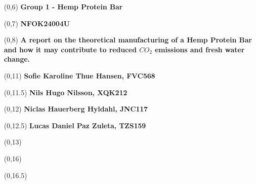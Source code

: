 \begin{titlepage}

    
    \begin{textblock}{9.4}(0,6)
        \Huge{\selectfont\bfseries{Group 1 - Hemp Protein Bar}}
    \end{textblock}
    \begin{textblock}{9.4}(0,7)
        \Huge{\selectfont\bfseries{NFOK24004U}}
    \end{textblock}
    
    \begin{textblock}{9.4}(0,8)
        \LARGE{\selectfont\bfseries{A report on the theoretical manufacturing of a Hemp Protein Bar and how it may contribute to reduced $CO_2$ emissions and fresh water change.}}
    \end{textblock}
    
    \begin{textblock}{9.4}(0,11)
        \large{\selectfont\bfseries{
        Sofie Karoline Thue Hansen, FVC568}}
    \end{textblock}
    \begin{textblock}{9.4}(0,11.5)
        \large{\selectfont\bfseries{
        Nils Hugo Nilsson, XQK212}}
    \end{textblock}
    \begin{textblock}{9.4}(0,12)
        \large{\selectfont\bfseries{
        Niclas Hauerberg Hyldahl, JNC117}}
    \end{textblock}
    \begin{textblock}{9.4}(0,12.5)
        \large{\selectfont\bfseries{
        Lucas Daniel Paz Zuleta, TZS159}}
    \end{textblock}
    
    \begin{textblock}{9.4}(0,13)
        \large{\selectfont{MSc students at the University of Copenhagen}}
    \end{textblock}
    
    \begin{textblock}{9.4}(0,16)
        \large{\selectfont{Last compiled: \today}}
    \end{textblock}
    
    \begin{textblock}{8.4}(0,16.5)
        \large{}
    \end{textblock}
    

\end{titlepage}
